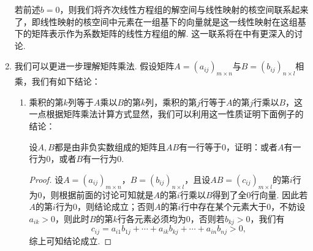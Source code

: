 \begin{enumerate}
          若前述$b=0$，则我们将齐次线性方程组的解空间与线性映射的核空间联系起来了，即线性映射的核空间中元素在一组基下的向量就是这一线性映射在这组基下的矩阵表示作为系数矩阵的线性方程组的解. 这一联系将在中有更深入的讨论.

    \item 我们可以更进一步理解矩阵乘法. 假设矩阵$A=(a_{ij})_{m\times n}$与$B=(b_{ij})_{n\times l}$相乘，我们有如下结论：
          \begin{enumerate}
              \item 乘积的第$k$列等于$A$乘以$B$的第$k$列，乘积的第$j$行等于$A$的第$j$行乘以$B$，这一点根据矩阵乘法计算方式显然，我们可以利用这一性质证明下面例子的结论：
                    \begin{example}{}{}
                        设$A,B$都是由非负实数组成的矩阵且$AB$有一行等于0，证明：或者$A$有一行为0，或者$B$有一行为0.
                    \end{example}
                    \begin{proof}
                        设$A=(a_{ij})_{m\times n}$，$B=(b_{ij})_{n\times l}$，且设$AB=(c_{ij})_{m\times l}$的第$i$行为0，则根据前面的讨论可知就是$A$的第$i$行乘以$B$得到了全0行向量. 因此若$A$的第$i$行为0，则结论成立；否则$A$的第$i$行中存在某个元素大于0，不妨设$a_{ik}>0$，则此时$B$的第$k$行各元素必须均为0，否则若$b_{kj}>0$，我们有
                        \[c_{ij}=a_{i1}b_{1j}+\cdots+a_{ik}b_{kj}+\cdots+a_{in}b_{nj}>0,\]
                        综上可知结论成立.
                    \end{proof}


\end{enumerate}
\end{enumerate}
